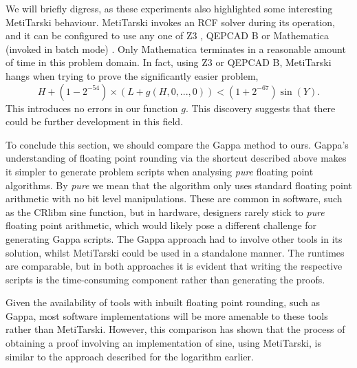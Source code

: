 \documentclass{fac}
\begin{document}
We will briefly digress, as these experiments also highlighted some interesting MetiTarski behaviour. MetiTarski invokes an RCF solver during its operation, and it can be configured to use any one of Z3 \cite{de2008z3}, QEPCAD B \cite{brown2003qepcad} or Mathematica (invoked in batch mode) \cite{Mathematica}. Only Mathematica terminates in a reasonable amount of time in this problem domain. In fact, using Z3 or QEPCAD B, MetiTarski hangs when trying to prove the significantly easier problem,
\begin{equation}
    H + (1-2^{-54})\times(L+g(H,0,...,0)) < (1+2^{-67})\sin{(Y)}.
\end{equation}
This introduces no errors in our function $g$. This discovery suggests that there could be further development in this field.

To conclude this section, we should compare the Gappa method to ours. Gappa's understanding of floating point rounding via the shortcut described above makes it simpler to generate problem scripts when analysing \textit{pure} floating point algorithms. By \textit{pure} we mean that the algorithm only uses standard floating point arithmetic with no bit level manipulations. These are common in software, such as the CRlibm sine function, but in hardware, designers rarely stick to \textit{pure} floating point arithmetic, which would likely pose a different challenge for generating Gappa scripts. The Gappa approach had to involve other tools in its solution, whilst MetiTarski could be used in a standalone manner. The runtimes are comparable, but in both approaches it is evident that writing the respective scripts is the time-consuming component rather than generating the proofs.

Given the availability of tools with inbuilt floating point rounding, such as Gappa, most software implementations will be more amenable to these tools rather than MetiTarski. However, this comparison has shown that the process of obtaining a proof involving an implementation of sine, using MetiTarski, is similar to the approach described for the logarithm earlier. 

\end{document}
